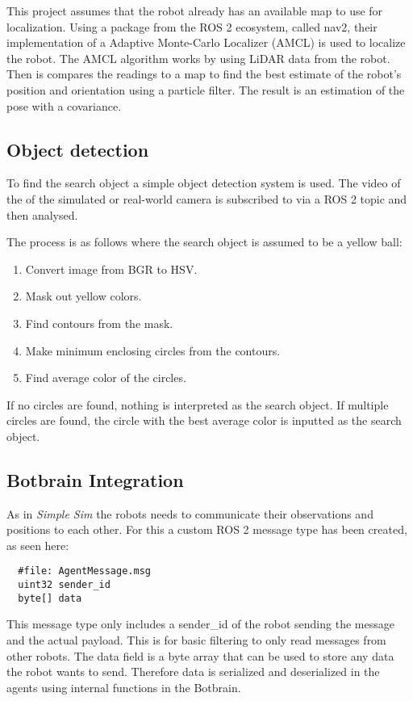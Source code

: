 This project assumes that the robot already has an available map to use for localization. 
Using a package from the ROS 2 ecosystem, called nav2, their implementation of a Adaptive Monte-Carlo Localizer (AMCL) is used to localize the robot.
The AMCL algorithm works by using LiDAR data from the robot. Then is compares the readings to a map to find the best estimate of the robot's position and orientation using a particle filter. The result is an estimation of the pose with a covariance.

\subsection{Object detection}\label{sub:object_detection}
To find the search object a simple object detection system is used. The video of the of the simulated or real-world camera is subscribed to via a ROS 2 topic and then analysed. 

The process is as follows where the search object is assumed to be a yellow ball:
\begin{enumerate}
  \item Convert image from BGR to HSV.
  \item Mask out yellow colors. 
  \item Find contours from the mask.
  \item Make minimum enclosing circles from the contours.
  \item Find average color of the circles.
\end{enumerate}

If no circles are found, nothing is interpreted as the search object. If multiple circles are found, the circle with the best average color is inputted as the search object.

\subsection{Botbrain Integration}\label{sub:Botbrain_integration}
As in \textit{Simple Sim} the robots needs to communicate their observations and positions to each other. For this a custom ROS 2 message type has been created, as seen here:
\begin{verbatim}
  #file: AgentMessage.msg
  uint32 sender_id
  byte[] data
\end{verbatim}

This message type only includes a sender\_id of the robot sending the message and the actual payload. This is for basic filtering to only read messages from other robots.
The data field is a byte array that can be used to store any data the robot wants to send. Therefore data is serialized and deserialized in the agents using internal functions in the Botbrain.

